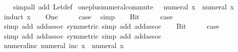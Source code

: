 \begin{isabellebody}
%
\isadelimproof
\ \ %
\endisadelimproof
%
\isatagproof
{}\isamarkupfalse%
\ {\isacharparenleft}{\kern0pt}simp{\isacharunderscore}{\kern0pt}all\ add{\isacharcolon}{\kern0pt}\ Let{\isacharunderscore}{\kern0pt}def{\isacharparenright}{\kern0pt}%
\endisatagproof
{\isafoldproof}%
%
\isadelimproof
\isanewline
%
\endisadelimproof
\isanewline
{}\isamarkupfalse%
\ one{\isacharunderscore}{\kern0pt}plus{\isacharunderscore}{\kern0pt}numeral{\isacharunderscore}{\kern0pt}commute{\isacharcolon}{\kern0pt}\ {\isachardoublequoteopen}{}\ {\isacharplus}{\kern0pt}\ numeral\ x\ {\isacharequal}{\kern0pt}\ numeral\ x\ {\isacharplus}{\kern0pt}\ {}{\isachardoublequoteclose}\isanewline
%
\isadelimproof
%
\endisadelimproof
%
\isatagproof
{}\isamarkupfalse%
\ {\isacharparenleft}{\kern0pt}induct\ x{\isacharparenright}{\kern0pt}\isanewline
\ \ \isamarkupfalse%
\ One\isanewline
\ \ \isamarkupfalse%
\ \isamarkupfalse%
\ {\isacharquery}{\kern0pt}case\ \isamarkupfalse%
\ simp\isanewline
{}\isamarkupfalse%
\isanewline
\ \ \isamarkupfalse%
\ Bit{}\isanewline
\ \ \isamarkupfalse%
\ \isamarkupfalse%
\ {\isacharquery}{\kern0pt}case\ \isamarkupfalse%
\ {\isacharparenleft}{\kern0pt}simp\ add{\isacharcolon}{\kern0pt}\ add{\isachardot}{\kern0pt}assoc\ {\isacharbrackleft}{\kern0pt}symmetric{\isacharbrackright}{\kern0pt}{\isacharparenright}{\kern0pt}\ {\isacharparenleft}{\kern0pt}simp\ add{\isacharcolon}{\kern0pt}\ add{\isachardot}{\kern0pt}assoc{\isacharparenright}{\kern0pt}\isanewline
{}\isamarkupfalse%
\isanewline
\ \ \isamarkupfalse%
\ Bit{}\isanewline
\ \ \isamarkupfalse%
\ \isamarkupfalse%
\ {\isacharquery}{\kern0pt}case\ \isamarkupfalse%
\ {\isacharparenleft}{\kern0pt}simp\ add{\isacharcolon}{\kern0pt}\ add{\isachardot}{\kern0pt}assoc\ {\isacharbrackleft}{\kern0pt}symmetric{\isacharbrackright}{\kern0pt}{\isacharparenright}{\kern0pt}\ {\isacharparenleft}{\kern0pt}simp\ add{\isacharcolon}{\kern0pt}\ add{\isachardot}{\kern0pt}assoc{\isacharparenright}{\kern0pt}\isanewline
{}\isamarkupfalse%
%
\endisatagproof
{\isafoldproof}%
%
\isadelimproof
\isanewline
%
\endisadelimproof
\isanewline
{}\isamarkupfalse%
\ numeral{\isacharunderscore}{\kern0pt}inc{\isacharcolon}{\kern0pt}\ {\isachardoublequoteopen}numeral\ {\isacharparenleft}{\kern0pt}inc\ x{\isacharparenright}{\kern0pt}\ {\isacharequal}{\kern0pt}\ numeral\ x\ {\isacharplus}{\kern0pt}\ {}{\isachardoublequoteclose}\isanewline

\end{isabellebody}
